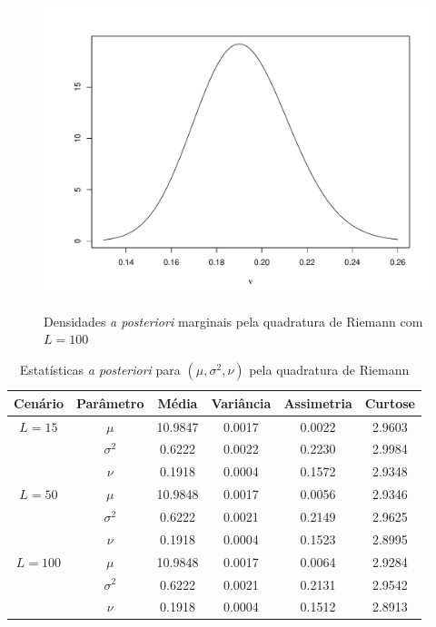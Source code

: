 \documentclass[9pt]{beamer}
\begin{document}
\begin{frame}
\begin{figure}[t]
{{\label{fig:dpm_nu_qr_100}
\includegraphics[scale=0.2]{figuras/dpm_nu_qr_100.pdf}}}%
\caption{Densidades \textit{a posteriori} marginais pela quadratura de Riemann com $L = 100$}%
\end{figure}
\end{frame}
\begin{frame}
\begin{table}[htb]
\caption{Estatísticas \textit{a posteriori} para $(\mu, \sigma^2, \nu)$ pela quadratura de Riemann}
\label{tab1}
\centering
\begin{tabular}{cccccc}
\toprule
Cenário & Parâmetro & Média & Variância & Assimetria & Curtose \\
\midrule
$L = 15$ & $\mu$      & 10.9847 & 0.0017 & 0.0022 & 2.9603 \\
& $\sigma^2$ &  0.6222 & 0.0022 & 0.2230 & 2.9984 \\
& $\nu$      &  0.1918 & 0.0004 & 0.1572 & 2.9348 \\
\midrule
$L = 50$ & $\mu$      & 10.9848 & 0.0017 & 0.0056 & 2.9346 \\
& $\sigma^2$ &  0.6222 & 0.0021 & 0.2149 & 2.9625 \\
& $\nu$      &  0.1918 & 0.0004 & 0.1523 & 2.8995 \\
\midrule
$L = 100$ & $\mu$      & 10.9848 & 0.0017 & 0.0064 & 2.9284 \\
& $\sigma^2$ &  0.6222 & 0.0021 & 0.2131 & 2.9542 \\
& $\nu$      &  0.1918 & 0.0004 & 0.1512 & 2.8913 \\
\bottomrule
\end{tabular}
\end{table}
\end{frame}
\end{document}
